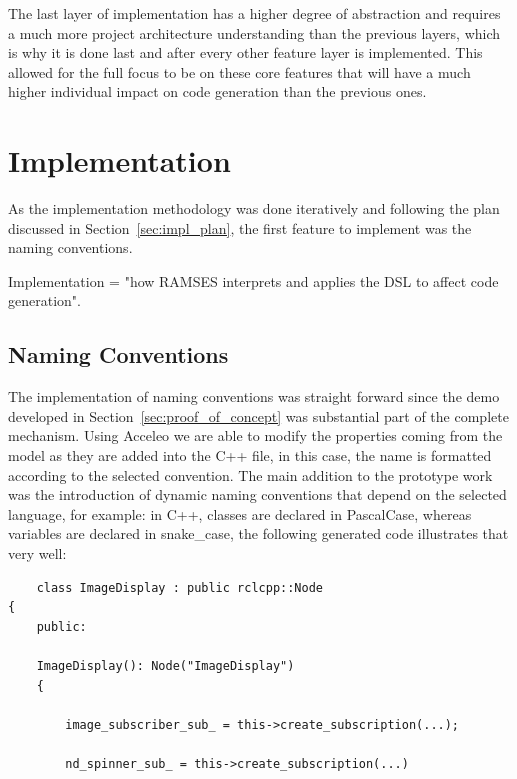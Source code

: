 The last layer of implementation has a higher degree of abstraction and requires a much more project architecture understanding than the previous layers, which is why it is done last and after every other feature layer is implemented. This allowed for the full focus to be on these core features that will have a much higher individual impact on code generation than the previous ones.

\section{Implementation}
\label{sec:implementation}


As the implementation methodology was done iteratively and following the plan discussed in Section~\ref{sec:impl_plan}, the first feature to implement was the naming conventions.


\begin{tcolorbox}[colback=green!5, colframe=green!40!black] Implementation = "how \gls{RAMSES} interprets and applies the DSL to affect code generation". \end{tcolorbox}


\subsection{Naming Conventions}
\label{sec:impl_name_conv}

The implementation of naming conventions was straight forward since the demo developed in Section~\ref{sec:proof_of_concept} was substantial part of the complete mechanism. Using Acceleo we are able to modify the properties coming from the model as they are added into the C++ file, in this case, the name is formatted according to the selected convention. The main addition to the prototype work was the introduction of dynamic naming conventions that depend on the selected language, for example: in C++, classes are declared in PascalCase, whereas variables are declared in snake\_case, the following generated code illustrates that very well:

\begin{verbatim}
	class ImageDisplay : public rclcpp::Node
{
	public:
	
	ImageDisplay(): Node("ImageDisplay")
	{
		
		image_subscriber_sub_ = this->create_subscription(...);
		
		nd_spinner_sub_ = this->create_subscription(...)
\end{verbatim}

